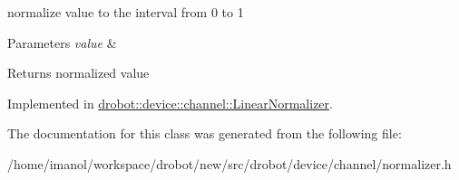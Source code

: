 normalize value to the interval from 0 to 1 


\begin{DoxyParams}{Parameters}
{\em value} & \\
\hline
\end{DoxyParams}
\begin{DoxyReturn}{Returns}
normalized value 
\end{DoxyReturn}


Implemented in \hyperlink{classdrobot_1_1device_1_1channel_1_1LinearNormalizer_a56e9bacaecd6b5310525d60ecd1a0f5c}{drobot\-::device\-::channel\-::\-Linear\-Normalizer}.



The documentation for this class was generated from the following file\-:\begin{DoxyCompactItemize}
\item 
/home/imanol/workspace/drobot/new/src/drobot/device/channel/normalizer.\-h\end{DoxyCompactItemize}
